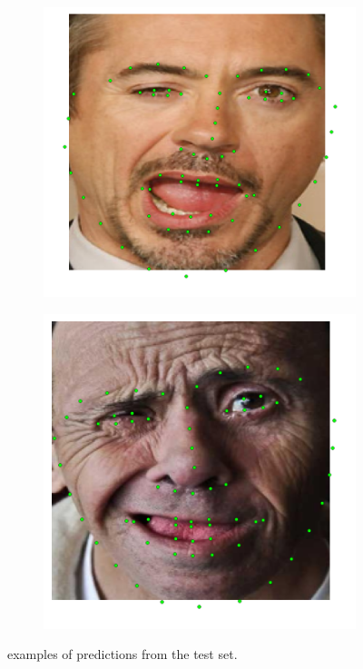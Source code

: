 \begin{figure}
    \begin{subfigure}{.61\textwidth}
        \centering
        \includegraphics[width=.8\linewidth]{figs/prediction1.png}
        \label{fig:pred1}
    \end{subfigure}
    \begin{subfigure}{.5\textwidth}
        \centering
        \includegraphics[width=.9\linewidth]{figs/prediction2.png}
        \label{fig:pred2}
    \end{subfigure}
    \caption{examples of predictions from the test set.}
    \label{figs:preds}
\end{figure}



